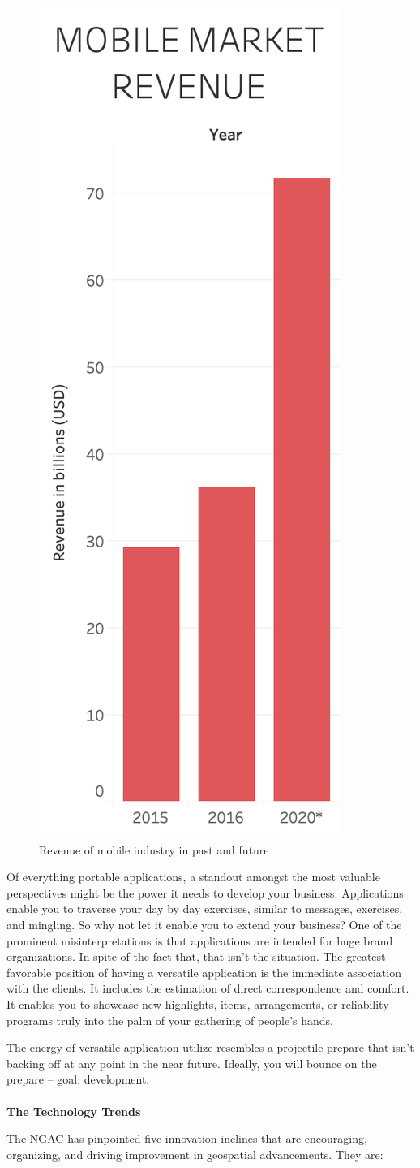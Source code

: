    \begin{figure}[H]
            \centering
            \includegraphics[width=0.25\linewidth]{figures/ch1/future_work_growth.png}
            \caption{\label{fig:future_work_distribution} Revenue of mobile industry in past and future \cite{eBiz_solutions}}
    \end{figure}

Of everything portable applications, a standout amongst the most valuable perspectives might be the power it needs to develop your business. Applications enable you to traverse your day by day exercises, similar to messages, exercises, and mingling. So why not let it enable you to extend your business? One of the prominent misinterpretations is that applications are intended for huge brand organizations. In spite of the fact that, that isn't the situation. The greatest favorable position of having a versatile application is the immediate association with the clients. It includes the estimation of direct correspondence and comfort. It enables you to showcase new highlights, items, arrangements, or reliability programs truly into the palm of your gathering of people's hands. 

The energy of versatile application utilize resembles a projectile prepare that isn't backing off at any point in the near future. Ideally, you will bounce on the prepare – goal: development. \\ \\
\textbf{The Technology Trends}

The NGAC has pinpointed five innovation inclines that are encouraging, organizing, and driving improvement in geospatial advancements. They are: 


